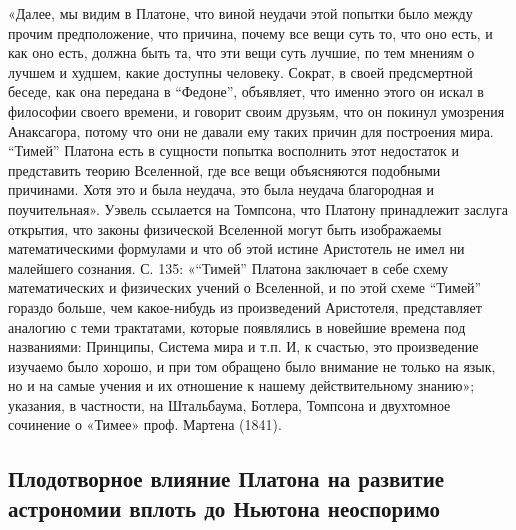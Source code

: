 «Далее, мы видим в Платоне, что виной неудачи этой попытки было между
прочим предположение, что причина, почему все вещи суть то, что оно
есть, и как оно есть, должна быть та, что эти вещи суть лучшие, по тем
мнениям о лучшем и худшем, какие доступны человеку. Сократ, в своей
предсмертной беседе, как она передана в ``Федоне'', объявляет, что
именно этого он искал в философии своего времени, и говорит своим
друзьям, что он покинул умозрения Анаксагора, потому что они не давали
ему таких причин для построения мира. ``Тимей'' Платона есть в
сущности попытка восполнить этот недостаток и представить теорию
Вселенной, где все вещи объясняются подобными причинами. Хотя это и
была неудача, это была неудача благородная и поучительная». Уэвель
ссылается на Томпсона, что Платону принадлежит заслуга открытия, что
законы физической Вселенной могут быть изображаемы математическими
формулами и что об этой истине Аристотель не имел ни малейшего
сознания. С. 135: «``Тимей'' Платона заключает в себе схему
математических и физических учений о Вселенной, и по этой схеме
``Тимей'' гораздо больше, чем какое-нибудь из произведений Аристотеля,
представляет аналогию с теми трактатами, которые появлялись в новейшие
времена под названиями: Принципы, Система мира и т.п. И, к счастью,
это произведение изучаемо было хорошо, и при том обращено было
внимание не только на язык, но и на самые учения и их отношение к
нашему действительному знанию»; указания, в частности, на Штальбаума,
Ботлера, Томпсона и двухтомное сочинение о «Тимее» проф. Мартена
(1841).

\subsection{Плодотворное влияние Платона на развитие астрономии вплоть
до Ньютона неоспоримо}

